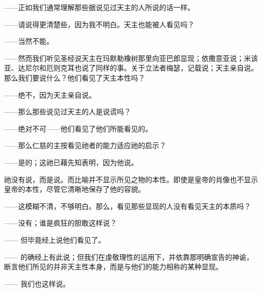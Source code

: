 ——正如我们通常理解那些据说见过天主的人所说的话一样。\par

——请说得更清楚些，因为我不明白。天主也能被人看见吗？\par

——当然不能。\par

——然而我们听见圣经说天主在玛默勒橡树那里向亚巴郎显现；依撒意亚说；米该亚、达尼尔和厄则克耳也说了同样的事。关于立法者梅瑟，记载说；天主亲自说。那么我们要说什么？他们看见了天主本性吗？\par

——绝不，因为天主亲自说。\par

——那么那些说见过天主的人是说谎吗？\par

——绝对不可——他们看见了他们所能看见的。\par

——那么仁慈的主按看见祂者的能力适应祂的启示？\par

——是的；这祂已藉先知表明，因为他说。\par

祂没有说，而是说。而比喻并不显示所见之物的本性。即使是皇帝的肖像也不显示皇帝的本性，尽管它清晰地保存了他的容貌。\par

——这模糊不清，不够明白。那么，看见那些显现的人没有看见天主的本质吗？\par

——没有；谁是疯狂的胆敢这样说？\par

—— 但毕竟经上说他们看见了。\par

—— 的确经上有此说；但我们在虔敬理性的运用下，并依靠那明确宣告的神谕，断言他们所见的并非天主性本身，而是与他们的能力相称的某种显现。\par

—— 我们也这样说。\par

